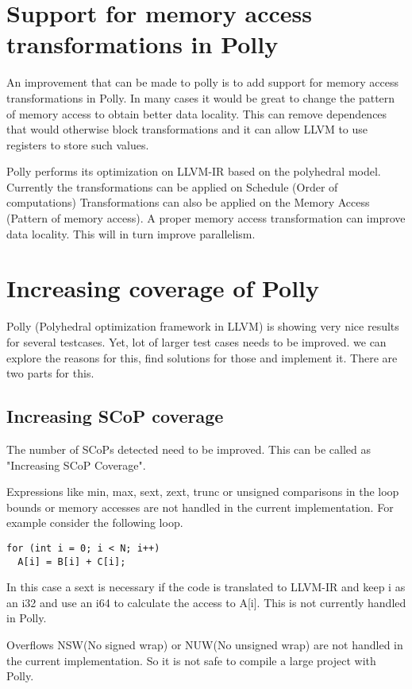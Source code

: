 \label{chap:future}
\section{Support for memory access transformations in Polly}
An improvement that can be made to polly is to add support for memory access transformations in Polly.
In many cases it would be great to change the pattern of memory access to obtain better data locality.
This can remove dependences that would otherwise block transformations and it can allow LLVM to use registers to store such values.

Polly performs its optimization on LLVM-IR based on the polyhedral model. Currently the transformations can be applied on Schedule (Order of computations)
Transformations can also be applied on the Memory Access (Pattern of memory access). A proper memory access transformation can improve data locality. This will in turn improve parallelism.

\section{Increasing coverage of Polly}

Polly (Polyhedral optimization framework in LLVM) is showing very nice results for
several testcases. Yet, lot of larger test cases needs to be improved. we can explore
the reasons for this, find solutions for those and implement it. There are two parts for this.

\subsection{Increasing SCoP coverage}

The number of SCoPs detected need to be improved. This can be called as "Increasing SCoP Coverage". 

Expressions like min, max, sext, zext, trunc or unsigned comparisons in the loop bounds or memory
accesses are not handled in the current implementation. For example consider the following loop.
{\footnotesize
\begin{lstlisting}
for (int i = 0; i < N; i++)
  A[i] = B[i] + C[i];
\end{lstlisting}
}
In this case a sext is necessary if the code is translated to LLVM-IR and keep i as an i32 and
use an i64 to calculate the access to A[i]. This is  not currently handled in Polly.

Overflows NSW(No signed wrap) or NUW(No unsigned wrap) are not handled in the current implementation. So
it is not safe to compile a large project with Polly.

